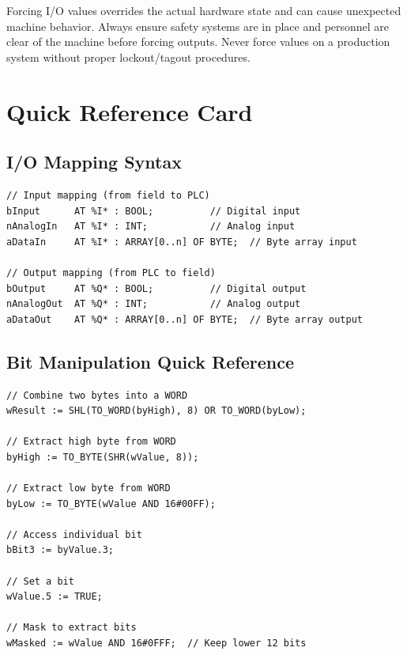 \documentclass[11pt,a4paper]{article}
\begin{document}
\begin{warningbox}
Forcing I/O values overrides the actual hardware state and can cause unexpected machine behavior. Always ensure safety systems are in place and personnel are clear of the machine before forcing outputs. Never force values on a production system without proper lockout/tagout procedures.
\end{warningbox}

\section*{Quick Reference Card}

\subsection*{I/O Mapping Syntax}

\begin{lstlisting}
// Input mapping (from field to PLC)
bInput      AT %I* : BOOL;          // Digital input
nAnalogIn   AT %I* : INT;           // Analog input
aDataIn     AT %I* : ARRAY[0..n] OF BYTE;  // Byte array input

// Output mapping (from PLC to field)
bOutput     AT %Q* : BOOL;          // Digital output
nAnalogOut  AT %Q* : INT;           // Analog output
aDataOut    AT %Q* : ARRAY[0..n] OF BYTE;  // Byte array output
\end{lstlisting}

\subsection*{Bit Manipulation Quick Reference}

\begin{lstlisting}
// Combine two bytes into a WORD
wResult := SHL(TO_WORD(byHigh), 8) OR TO_WORD(byLow);

// Extract high byte from WORD
byHigh := TO_BYTE(SHR(wValue, 8));

// Extract low byte from WORD
byLow := TO_BYTE(wValue AND 16#00FF);

// Access individual bit
bBit3 := byValue.3;

// Set a bit
wValue.5 := TRUE;

// Mask to extract bits
wMasked := wValue AND 16#0FFF;  // Keep lower 12 bits
\end{lstlisting}
\end{document}
